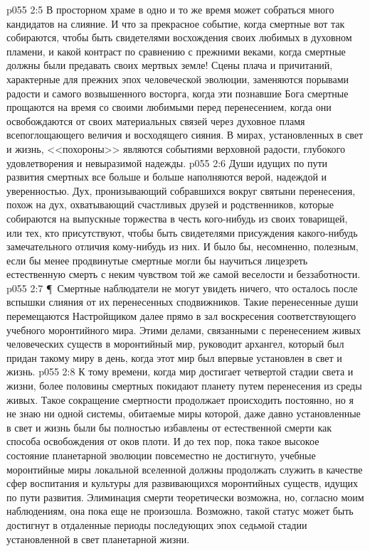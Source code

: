 \vs p055 2:5 В просторном храме в одно и то же время может собраться много кандидатов на слияние. И что за прекрасное событие, когда смертные вот так собираются, чтобы быть свидетелями восхождения своих любимых в духовном пламени, и какой контраст по сравнению с прежними веками, когда смертные должны были предавать своих мертвых земле! Сцены плача и причитаний, характерные для прежних эпох человеческой эволюции, заменяются порывами радости и самого возвышенного восторга, когда эти познавшие Бога смертные прощаются на время со своими любимыми перед перенесением, когда они освобождаются от своих материальных связей через духовное пламя всепоглощающего величия и восходящего сияния. В мирах, установленных в свет и жизнь, <<похороны>> являются событиями верховной радости, глубокого удовлетворения и невыразимой надежды.
\vs p055 2:6 Души идущих по пути развития смертных все больше и больше наполняются верой, надеждой и уверенностью. Дух, пронизывающий собравшихся вокруг святыни перенесения, похож на дух, охватывающий счастливых друзей и родственников, которые собираются на выпускные торжества в честь кого\hyp{}нибудь из своих товарищей, или тех, кто присутствуют, чтобы быть свидетелями присуждения какого\hyp{}нибудь замечательного отличия кому\hyp{}нибудь из них. И было бы, несомненно, полезным, если бы менее продвинутые смертные могли бы научиться лицезреть естественную смерть с неким чувством той же самой веселости и беззаботности.
\vs p055 2:7 \P\ Смертные наблюдатели не могут увидеть ничего, что осталось после вспышки слияния от их перенесенных сподвижников. Такие перенесенные души перемещаются Настройщиком далее прямо в зал воскресения соответствующего учебного моронтийного мира. Этими делами, связанными с перенесением живых человеческих существ в моронтийный мир, руководит архангел, который был придан такому миру в день, когда этот мир был впервые установлен в свет и жизнь.
\vs p055 2:8 К тому времени, когда мир достигает четвертой стадии света и жизни, более половины смертных покидают планету путем перенесения из среды живых. Такое сокращение смертности продолжает происходить постоянно, но я не знаю ни одной системы, обитаемые миры которой, даже давно установленные в свет и жизнь были бы полностью избавлены от естественной смерти как способа освобождения от оков плоти. И до тех пор, пока такое высокое состояние планетарной эволюции повсеместно не достигнуто, учебные моронтийные миры локальной вселенной должны продолжать служить в качестве сфер воспитания и культуры для развивающихся моронтийных существ, идущих по пути развития. Элиминация смерти теоретически возможна, но, согласно моим наблюдениям, она пока еще не произошла. Возможно, такой статус может быть достигнут в отдаленные периоды последующих эпох седьмой стадии установленной в свет планетарной жизни.

